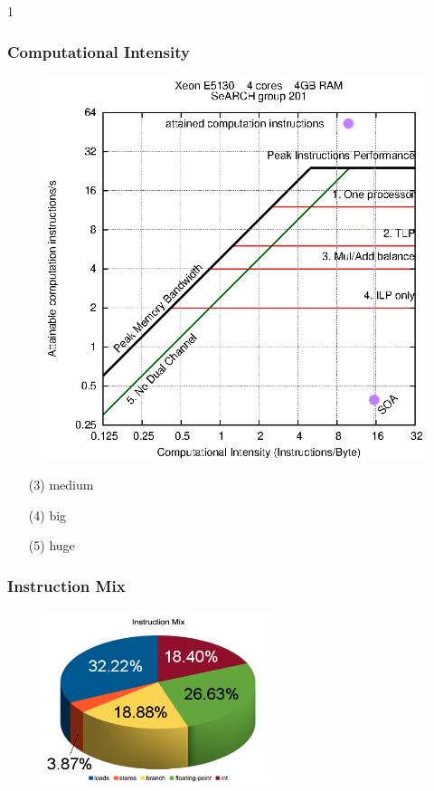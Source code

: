 1\documentclass{beamer}
\begin{document}
\begin{frame}
	\frametitle{Computational Intensity}
	\begin{minipage}{0.78\textwidth}
		\begin{figure}
			\begin{center}
				\includegraphics[width=\textwidth]{images/roofline/201.eps}
			\end{center}
		\end{figure}
	\end{minipage}
	\begin{minipage}{0.2\textwidth}
		\begin{itemize}
			\item[(3)]{medium}
			\item[(4)]{big}
			\item[(5)]{huge}
		\end{itemize}
	\end{minipage}
\end{frame}

\begin{frame}
	\frametitle{Instruction Mix}
	\begin{figure}
		\begin{center}
			\includegraphics[width=0.6\textwidth]{images/slides.march/instmx.png}
		\end{center}
	\end{figure}
\end{frame}
\end{document}
